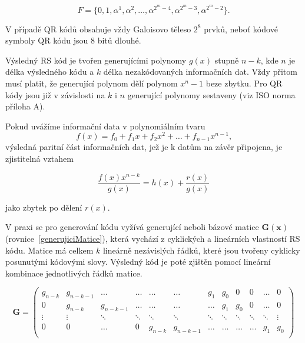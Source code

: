 \begin{equation}
  F = \{ 0, 1, \alpha^1, \alpha^2, \ldots, \alpha^{2^{m}-4}, \alpha^{2^{m}-3},
  \alpha^{2^{m}-2}\}\mbox{.}
\end{equation}

\noindent V případě QR kódů obsahuje vždy Galoisovo těleso $2^8$ prvků, neboť
kódové symboly QR kódu jsou 8 bitů dlouhé. \cite{sklarRSCodes}

Výsledný RS kód je tvořen generujícími polynomy 
$g(x)$ stupně $n-k$, kde $n$ je délka výsledného kódu a $k$ délka nezakódovaných 
informačních dat. Vždy přitom musí platit, že generující polynom dělí polynom 
$x^n-1$ beze zbytku. Pro QR kódy jsou již v závislosti na $k$ i $n$ generující 
polynomy sestaveny (viz ISO norma příloha A).

Pokud uvážíme informační data v polynomiálním tvaru
\begin{equation}
  f(x) = f_{0} + f_{1}x + f_{2}x^2 + \ldots + f_{n-1}x^{n-1}\mbox{,}
\end{equation}
\noindent výsledná paritní část informačních dat, jež je k datům na závěr
připojena, je zjistitelná vztahem

\begin{equation}
  \frac{f(x) x^{n-k}}{g(x)} = h(x) + \frac{r(x)}{g(x)}
\end{equation}

\noindent jako zbytek po dělení $r(x)$. \cite{decodingRSCodesLiterature}

V praxi se pro generování kódu vyžívá generující neboli bázové matice
$\mathbf{G(x)}$ (rovnice~\ref{generujiciMatice}), která vychází z cyklických a
lineárních vlastností RS kódu.
Matice má celkem $k$ lineárně nezávislých řádků, které jsou tvořeny cyklicky posunutými kódovými 
slovy. Výsledný kód je poté zjištěn pomocí lineární kombinace jednotlivých 
řádků matice. \cite{hallBCH}

\begin{equation}
  \mathbf{G} = \left(
    \begin{array}{cccccccccccc}
      g_{n-k} & g_{n-k-1} & \ldots & \ldots & \ldots & \ldots & g_{1} & g_{0} &
      0 & 0 & \ldots & 0 \\
      0 & g_{n-k} & g_{n-k-1} & \ldots & \ldots & \ldots & \ldots & g_{1} &
      g_{0} & 0 & \ldots & 0 \\
      \vdots & \vdots & \ddots & \ddots & \ddots & \ddots & \ddots & \ddots &
      \ddots & \ddots & \ddots & \vdots \\
      0 & 0 & \ldots & 0 & g_{n-k} & g_{n-k-1} & \ldots & \ldots & \ldots &
      \ldots & g_{1} & g_{0} \\
    \end{array}
  \right)
  \label{generujiciMatice}
\end{equation}

